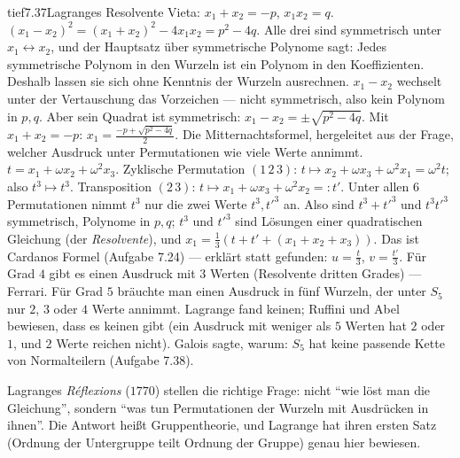 \begin{loesungkarte}{tief}{7.37}{Lagranges Resolvente}
Vieta: $x_1 + x_2 = -p$, $x_1x_2 = q$. $(x_1 - x_2)^{2} = (x_1 + x_2)^{2} - 4x_1x_2 = p^{2} - 4q$. Alle drei sind symmetrisch unter $x_1\leftrightarrow x_2$, und der Hauptsatz über symmetrische Polynome sagt: Jedes symmetrische Polynom in den Wurzeln ist ein Polynom in den Koeffizienten. Deshalb lassen sie sich ohne Kenntnis der Wurzeln ausrechnen.
$x_1 - x_2$ wechselt unter der Vertauschung das Vorzeichen --- nicht symmetrisch, also kein Polynom in $p, q$. Aber sein Quadrat ist symmetrisch: $x_1 - x_2 = \pm\sqrt{p^{2} - 4q}$. Mit $x_1 + x_2 = -p$: $x_1 = \frac{-p + \sqrt{p^{2} - 4q}}2$. Die Mitternachtsformel, hergeleitet aus der Frage, welcher Ausdruck unter Permutationen wie viele Werte annimmt.
$t = x_1 + \omega x_2 + \omega^{2}x_3$. Zyklische Permutation $(1\,2\,3)$: $t\mapsto x_2 + \omega x_3 + \omega^{2}x_1 = \omega^{2}t$; also $t^{3}\mapsto t^{3}$. Transposition $(2\,3)$: $t\mapsto x_1 + \omega x_3 + \omega^{2}x_2 =: t'$. Unter allen $6$ Permutationen nimmt $t^{3}$ nur die zwei Werte $t^{3}, t'^{3}$ an. Also sind $t^{3} + t'^{3}$ und $t^{3}t'^{3}$ symmetrisch, Polynome in $p, q$; $t^{3}$ und $t'^{3}$ sind Lösungen einer quadratischen Gleichung (der \emph{Resolvente}), und $x_1 = \frac13(t + t' + (x_1 + x_2 + x_3))$. Das ist Cardanos Formel (Aufgabe 7.24) --- erklärt statt gefunden: $u = \frac t3$, $v = \frac{t'}3$.
Für Grad $4$ gibt es einen Ausdruck mit $3$ Werten (Resolvente dritten Grades) --- Ferrari. Für Grad $5$ bräuchte man einen Ausdruck in fünf Wurzeln, der unter $S_5$ nur $2$, $3$ oder $4$ Werte annimmt. Lagrange fand keinen; Ruffini und Abel bewiesen, dass es keinen gibt (ein Ausdruck mit weniger als $5$ Werten hat $2$ oder $1$, und $2$ Werte reichen nicht). Galois sagte, warum: $S_5$ hat keine passende Kette von Normalteilern (Aufgabe 7.38).
\begin{mitnehmen}\kastentext
Lagranges \emph{Réflexions} ($1770$) stellen die richtige Frage: nicht \enquote{wie löst man die Gleichung}, sondern \enquote{was tun Permutationen der Wurzeln mit Ausdrücken in ihnen}. Die Antwort heißt Gruppentheorie, und Lagrange hat ihren ersten Satz (Ordnung der Untergruppe teilt Ordnung der Gruppe) genau hier bewiesen.
\end{mitnehmen}
\end{loesungkarte}

